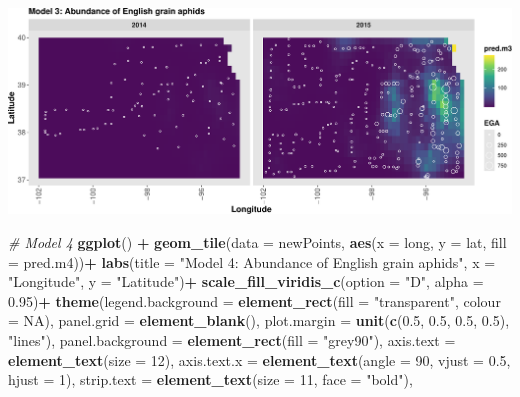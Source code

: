 \documentclass[
]{book}
\newenvironment{Shaded}{\begin{snugshade}}{\end{snugshade}}
\newcommand{\AttributeTok}[1]{\textcolor[rgb]{0.13,0.29,0.53}{#1}}
\newcommand{\CommentTok}[1]{\textcolor[rgb]{0.56,0.35,0.01}{\textit{#1}}}
\newcommand{\ConstantTok}[1]{\textcolor[rgb]{0.56,0.35,0.01}{#1}}
\newcommand{\DecValTok}[1]{\textcolor[rgb]{0.00,0.00,0.81}{#1}}
\newcommand{\FloatTok}[1]{\textcolor[rgb]{0.00,0.00,0.81}{#1}}
\newcommand{\FunctionTok}[1]{\textcolor[rgb]{0.13,0.29,0.53}{\textbf{#1}}}
\newcommand{\NormalTok}[1]{#1}
\newcommand{\SpecialCharTok}[1]{\textcolor[rgb]{0.81,0.36,0.00}{\textbf{#1}}}
\newcommand{\StringTok}[1]{\textcolor[rgb]{0.31,0.60,0.02}{#1}}
\begin{document}
\includegraphics{_main_files/figure-latex/unnamed-chunk-40-1.pdf}

\begin{Shaded}
\begin{Highlighting}[]
\CommentTok{\# Model 4}
\FunctionTok{ggplot}\NormalTok{() }\SpecialCharTok{+}
  \FunctionTok{geom\_tile}\NormalTok{(}\AttributeTok{data =}\NormalTok{ newPoints, }\FunctionTok{aes}\NormalTok{(}\AttributeTok{x =}\NormalTok{ long, }\AttributeTok{y =}\NormalTok{ lat, }\AttributeTok{fill =}\NormalTok{ pred.m4))}\SpecialCharTok{+}
  \FunctionTok{labs}\NormalTok{(}\AttributeTok{title =} \StringTok{"Model 4: Abundance of English grain aphids"}\NormalTok{, }\AttributeTok{x =} \StringTok{"Longitude"}\NormalTok{, }\AttributeTok{y =} \StringTok{"Latitude"}\NormalTok{)}\SpecialCharTok{+}
  \FunctionTok{scale\_fill\_viridis\_c}\NormalTok{(}\AttributeTok{option =} \StringTok{"D"}\NormalTok{, }\AttributeTok{alpha =} \FloatTok{0.95}\NormalTok{)}\SpecialCharTok{+}
  \FunctionTok{theme}\NormalTok{(}\AttributeTok{legend.background =} \FunctionTok{element\_rect}\NormalTok{(}\AttributeTok{fill =} \StringTok{"transparent"}\NormalTok{, }\AttributeTok{colour =} \ConstantTok{NA}\NormalTok{),}
        \AttributeTok{panel.grid =} \FunctionTok{element\_blank}\NormalTok{(),}
        \AttributeTok{plot.margin =} \FunctionTok{unit}\NormalTok{(}\FunctionTok{c}\NormalTok{(}\FloatTok{0.5}\NormalTok{, }\FloatTok{0.5}\NormalTok{, }\FloatTok{0.5}\NormalTok{, }\FloatTok{0.5}\NormalTok{), }\StringTok{"lines"}\NormalTok{),}
        \AttributeTok{panel.background =} \FunctionTok{element\_rect}\NormalTok{(}\AttributeTok{fill =} \StringTok{"grey90"}\NormalTok{),}
        \AttributeTok{axis.text =} \FunctionTok{element\_text}\NormalTok{(}\AttributeTok{size =} \DecValTok{12}\NormalTok{), }
        \AttributeTok{axis.text.x =} \FunctionTok{element\_text}\NormalTok{(}\AttributeTok{angle =} \DecValTok{90}\NormalTok{, }\AttributeTok{vjust =} \FloatTok{0.5}\NormalTok{, }\AttributeTok{hjust =} \DecValTok{1}\NormalTok{),}
        \AttributeTok{strip.text =} \FunctionTok{element\_text}\NormalTok{(}\AttributeTok{size =} \DecValTok{11}\NormalTok{, }\AttributeTok{face =} \StringTok{"bold"}\NormalTok{),}

\end{Highlighting}
\end{Shaded}
\end{document}
